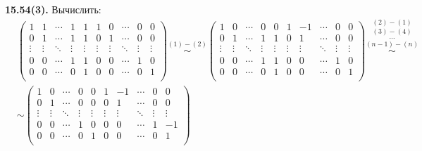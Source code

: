 \documentclass[a4paper,12pt]{article} %
\begin{document}
\noindent\textbf{15.54(3).}
Вычислить:
\begin{align*}
	&\left(
		\begin{array}{ccccc|ccccc}
		1&1&\cdots&1&1					&1&0&\cdots&0&0\\
		0&1&\cdots&1&1    				&0&1&\cdots&0&0\\
		\vdots&\vdots&\ddots&\vdots&\vdots&\vdots
		&\vdots&\ddots&\vdots&\vdots\\
		0&0&\cdots&1&1     				&0&0&\cdots&1&0\\
		0&0&\cdots&0&1 					&0&0&\cdots&0&1\\
		\end{array}
	\right)
	\stackrel{(1)-(2)}{\sim}
	\left(
		\begin{array}{ccccc|ccccc}
		1&0&\cdots&0&0					&1&-1&\cdots&0&0\\
		0&1&\cdots&1&1    				&0&1&\cdots&0&0\\
		\vdots&\vdots&\ddots&\vdots&\vdots&\vdots
		&\vdots&\ddots&\vdots&\vdots\\
		0&0&\cdots&1&1     				&0&0&\cdots&1&0\\
		0&0&\cdots&0&1 					&0&0&\cdots&0&1\\
		\end{array}
	\right)
	\stackrel{(2)-(1)}{\stackrel{(3)-(4)}{\stackrel{\cdots}{\stackrel{(n-1)-(n)}{\sim}}}}\\
	&\sim\left(
	\begin{array}{ccccc|ccccc}
	1&0&\cdots&0&0					&1&-1&\cdots&0&0\\
	0&1&\cdots&0&0    				&0&1&\cdots&0&0\\
	\vdots&\vdots&\ddots&\vdots&\vdots&\vdots
	&\vdots&\ddots&\vdots&\vdots\\
	0&0&\cdots&1&0     				&0&0&\cdots&1&-1\\
	0&0&\cdots&0&1 					&0&0&\cdots&0&1\\
	\end{array}
	\right)
\end{align*}
\end{document}
